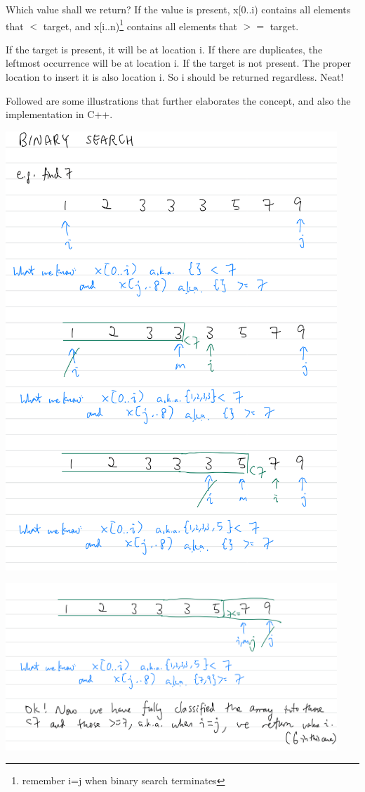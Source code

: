 Which value shall we return? If the value is present, x[0..i) contains all elements that $<$ target, and x[i..n)\footnote{remember i=j when binary search terminates} contains all elements that $>=$ target. 

If the target is present, it will be at location i. If there are duplicates, the leftmost occurrence will be at location i. If the target is not present. The proper location to insert it is also location i. So i should be returned regardless. Neat!

Followed are some illustrations that further elaborates the concept, and also the implementation in C++.
\vspace{6mm}

\includegraphics[width=12.5cm]{images/ch7-binarysearch71.png}

\includegraphics[width=12.5cm]{images/ch7-binarysearch72.png}

